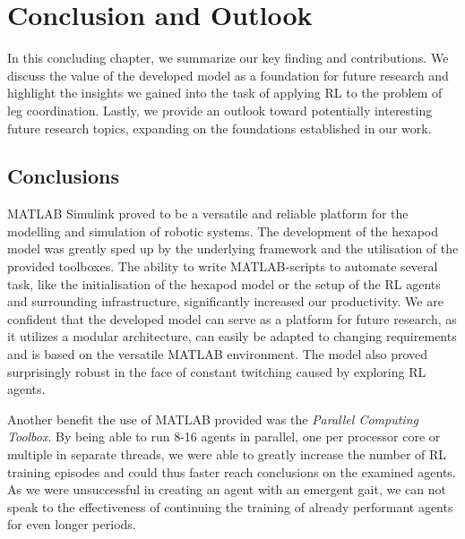 \chapter{Conclusion and Outlook}
\label{ch:conclusion}

In this concluding chapter, we summarize our key finding and contributions.
We discuss the value of the developed model as a foundation for future research and highlight the insights we gained into the task of applying RL to the problem of leg coordination.
Lastly, we provide an outlook toward potentially interesting future research topics, expanding on the foundations established in our work.

\section{Conclusions}

MATLAB Simulink proved to be a versatile and reliable platform for the modelling and simulation of robotic systems.
The development of the hexapod model was greatly sped up by the underlying framework and the utilisation of the provided toolboxes.
The ability to write MATLAB-scripts to automate several task, like the initialisation of the hexapod model or the setup of the RL agents and surrounding infrastructure, significantly increased our productivity.
We are confident that the developed model can serve as a platform for future research, as it utilizes a modular architecture, can easily be adapted to changing requirements and is based on the versatile MATLAB environment.
The model also proved surprisingly robust in the face of constant twitching caused by exploring RL agents.

Another benefit the use of MATLAB provided was the \textit{Parallel Computing Toolbox}. 
By being able to run 8-16 agents in parallel, one per processor core or multiple in separate threads, we were able to greatly increase the number of RL training episodes and could thus faster reach conclusions on the examined agents.
As we were unsuccessful in creating an agent with an emergent gait, we can not speak to the effectiveness of continuing the training of already performant agents for even longer periods.

